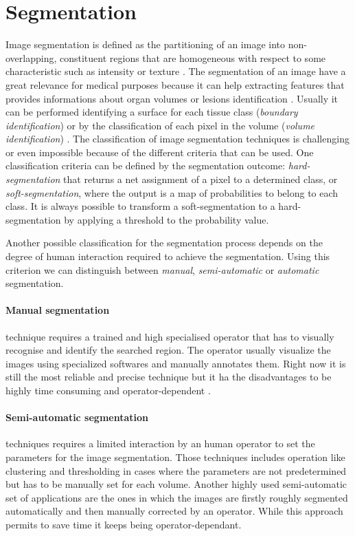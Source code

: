 \documentclass{standalone}
\begin{document}
\section{Segmentation}
Image segmentation is defined as the partitioning of an image into non-overlapping, constituent regions that are homogeneous with respect to some characteristic such as intensity or texture \cite{ART:Pham}. 
The segmentation of an image have a great relevance for medical purposes because it can help extracting features that provides informations about organ volumes or lesions identification \cite{mastersthesis:Biondi}.
Usually it can be performed identifying a surface for each tissue class (\textit{boundary identification}) or by the classification of each pixel in the volume (\textit{volume identification}) \cite{ART:Withey}.
The classification of image segmentation techniques is challenging or even impossible because of the different criteria that can be used. One classification criteria can be defined by the segmentation outcome:  \emph{hard-segmentation} that returns a net assignment of a pixel to a determined class, or \emph{soft-segmentation}, where the output is a map of probabilities to belong to each class. It is always possible to transform a soft-segmentation to a hard-segmentation by applying a threshold to the probability value.

Another possible classification for the segmentation process depends on the degree of human interaction required to achieve the segmentation. Using this criterion we can distinguish between \emph{manual}, \emph{semi-automatic} or \emph{automatic} segmentation.

\paragraph{Manual segmentation}
technique requires a trained and high specialised operator that has to visually recognise and identify the searched region. The operator usually visualize the images using specialized softwares and manually annotates them. Right now it is still the most reliable and precise technique but it ha the disadvantages to be highly time consuming and operator-dependent \cite{mastersthesis:Filitto}.

\paragraph{Semi-automatic segmentation}
techniques requires a limited interaction by an human operator to set the parameters for the image segmentation.
Those techniques includes operation like clustering and thresholding in cases where the parameters are not predetermined but has to be manually set for each volume.
Another highly used semi-automatic set of applications are the ones in which the images are firstly roughly segmented automatically and then manually corrected by an operator.
While this approach permits to save time it keeps being operator-dependant.
\end{document}
